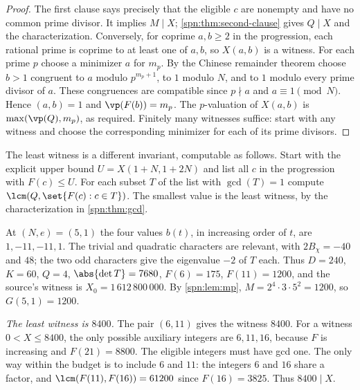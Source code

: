 \begin{proof}
The first clause says precisely that the eligible $c$ are nonempty and have
no common prime divisor. It implies $M\mid X$; \cref{spn:thm:second-clause}
gives $Q\mid X$ and the characterization. Conversely, for coprime $a,b\ge2$
in the progression, each rational prime is coprime to at least one of $a,b$,
so $X(a,b)$ is a witness. For each prime $p$ choose a minimizer $a$ for
$m_p$. By the Chinese remainder theorem choose $b>1$ congruent to $a$ modulo
$p^{m_p+1}$, to $1$ modulo $N$, and to $1$ modulo every prime divisor of
$a$. These congruences are compatible since $p\nmid a$ and
$a\equiv1\pmod N$. Hence $(a,b)=1$ and $\vp(F(b))=m_p$. The $p$-valuation of
$X(a,b)$ is $\max(\vp(Q),m_p)$, as required. Finitely many witnesses
suffice: start with any witness and choose the corresponding minimizer for
each of its prime divisors.
\end{proof}

The least witness is a different invariant, computable as follows. Start with
the explicit upper bound $U=X(1+N,1+2N)$ and list all $c$ in the progression
with $F(c)\le U$. For each subset $T$ of the list with $\gcd(T)=1$ compute
$\lcm(Q,\set{F(c):c\in T})$. The smallest value is the least witness, by the
characterization in \cref{spn:thm:gcd}.

\begin{example}\label{spn:ex:five}
At $(N,e)=(5,1)$ the four values $b(t)$, in increasing order of $t$, are
$1,-11,-11,1$. The trivial and quadratic characters are relevant, with
$2B_\chi=-40$ and $48$; the two odd characters give the eigenvalue $-2$ of
$T$ each. Thus $D=240$, $K=60$, $Q=4$, $\abs{\det T}=7680$, $F(6)=175$,
$F(11)=1200$, and the source's witness is $X_0=1\,612\,800\,000$. By
\cref{spn:lem:mp}, $M=2^4\cdot3\cdot5^2=1200$, so $G(5,1)=1200$.

\emph{The least witness is $8400$.} The pair $(6,11)$ gives the witness
$8400$. For a witness $0<X\le8400$, the only possible auxiliary integers are
$6,11,16$, because $F$ is increasing and $F(21)=8800$. The eligible integers
must have gcd one. The only way within the budget is to include $6$ and
$11$: the integers $6$ and $16$ share a factor, and
$\lcm(F(11),F(16))=61200$ since $F(16)=3825$. Thus $8400\mid X$.
\end{example}

